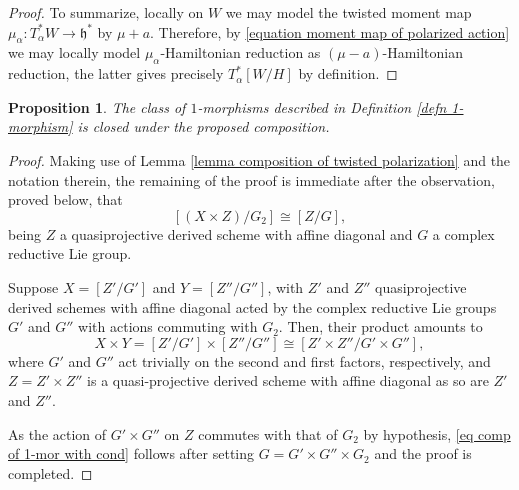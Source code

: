 \documentclass[11pt, a4paper]{amsart}
\numberwithin{equation}{section}
\newtheorem{proposition}[theorem]{Proposition}
\theoremstyle{definition}
\theoremstyle{remark}
\renewcommand{\to}{\longrightarrow}
\begin{document}
\begin{proof}
To summarize, locally on $W$ we may model the twisted moment map $\mu_\alpha: T^*_\alpha W \to \mathfrak{h}^*$ by $\mu+a$. Therefore, by \eqref{equation moment map of polarized action} we may locally model $\mu_\alpha$-Hamiltonian reduction as $(\mu-a)$-Hamiltonian reduction, the latter gives precisely $T^*_\alpha [W/H]$ by definition.
\end{proof}

\begin{proposition}
The class of $1$-morphisms described in Definition \ref{defn 1-morphism} is closed under the proposed composition.
\end{proposition}

\begin{proof}
Making use of Lemma \ref{lemma composition of twisted polarization} and the notation therein, the remaining of the proof is immediate after the observation, proved below, that
\begin{equation} \label{eq comp of 1-mor with cond}
[(X \times Z)/G_2] \cong [Z/G],
\end{equation}
being $Z$ a quasiprojective derived scheme with affine diagonal and $G$ a complex reductive Lie group.

Suppose $X = [Z'/G']$ and $Y = [Z''/G'']$, with $Z'$ and $Z''$ quasiprojective derived schemes with affine diagonal acted by the complex reductive Lie groups $G'$ and $G''$ with actions commuting with $G_2$. Then, their product amounts to
\[
X \times Y = [Z'/G'] \times [Z''/G''] \cong [Z' \times Z''/G' \times G''],
\]
where $G'$ and $G''$ act trivially on the second and first factors, respectively, and $Z = Z' \times Z''$ is a quasi-projective derived scheme with affine diagonal as so are $Z'$ and $Z''$. 

As the action of $G' \times G''$ on $Z$ commutes with that of $G_2$ by hypothesis, \eqref{eq comp of 1-mor with cond} follows after setting $G = G' \times G'' \times G_2$ and the proof is completed.
\end{proof}
\end{document}

